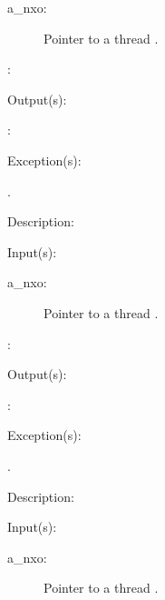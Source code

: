 \begin{capi}
\begin{capilist}
\begin{description}
		\item[a\_nxo: ]
			Pointer to a thread .
		\item[: ]
		\end{description}
	\item[Output(s): ]
		\begin{description}\item[]
		\item[: ]
		\end{description}
	\item[Exception(s): ]
		\begin{description}\item[]
		\item[.]
		\end{description}
	\item[Description: ]
	\end{capilist}
\label{nxo_thread_}
	\begin{capilist}
	\item[Input(s): ]
		\begin{description}\item[]
		\item[a\_nxo: ]
			Pointer to a thread .
		\item[: ]
		\end{description}
	\item[Output(s): ]
		\begin{description}\item[]
		\item[: ]
		\end{description}
	\item[Exception(s): ]
		\begin{description}\item[]
		\item[.]
		\end{description}
	\item[Description: ]
	\end{capilist}
\label{nxo_thread_}
	\begin{capilist}
	\item[Input(s): ]
		\begin{description}\item[]
		\item[a\_nxo: ]
			Pointer to a thread \classname{nxo}.

\end{description}
\end{capilist}
\end{capi}
